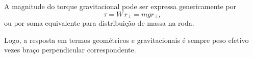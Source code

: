 A magnitude do torque gravitacional pode ser expressa genericamente por
\[
\tau = W\,r_\perp = m g r_\perp,
\]
ou por soma equivalente para distribuição de massa na roda.

Logo, a resposta em termos geométricos e gravitacionais é sempre peso efetivo vezes braço perpendicular correspondente.

